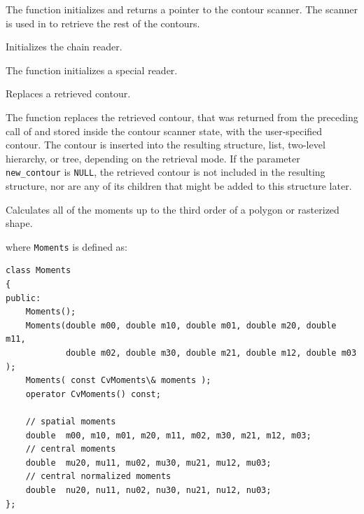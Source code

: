 The function initializes and returns a pointer to the contour scanner. The scanner is used in  to retrieve the rest of the contours.

Initializes the chain reader.


The function initializes a special reader.

Replaces a retrieved contour.


\begin{description}
\end{description}

The function replaces the retrieved
contour, that was returned from the preceding call of
 and stored inside the contour scanner
state, with the user-specified contour. The contour is inserted
into the resulting structure, list, two-level hierarchy, or tree,
depending on the retrieval mode. If the parameter \texttt{new\_contour}
is \texttt{NULL}, the retrieved contour is not included in the
resulting structure, nor are any of its children that might be added
to this structure later.

\fi

\fi


\ifCpp

Calculates all of the moments up to the third order of a polygon or rasterized shape.


where \texttt{Moments} is defined as:
\begin{lstlisting}
class Moments
{
public:
    Moments();
    Moments(double m00, double m10, double m01, double m20, double m11,
            double m02, double m30, double m21, double m12, double m03 );
    Moments( const CvMoments\& moments );
    operator CvMoments() const;
    
    // spatial moments
    double  m00, m10, m01, m20, m11, m02, m30, m21, m12, m03;
    // central moments
    double  mu20, mu11, mu02, mu30, mu21, mu12, mu03;
    // central normalized moments
    double  nu20, nu11, nu02, nu30, nu21, nu12, nu03;
};
\end{lstlisting}

